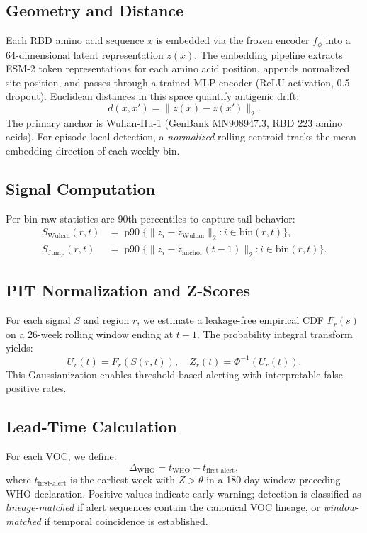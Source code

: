 \documentclass[11pt]{article}
\begin{document}
\subsection{Geometry and Distance}
Each RBD amino acid sequence $x$ is embedded via the frozen encoder $f_{\phi}$ into a 64-dimensional latent representation $z(x)$. The embedding pipeline extracts ESM-2 token representations for each amino acid position, appends normalized site position, and passes through a trained MLP encoder (ReLU activation, 0.5 dropout). Euclidean distances in this space quantify antigenic drift:
\[
d(x, x') = \|z(x) - z(x')\|_2.
\]
The primary anchor is Wuhan-Hu-1 (GenBank MN908947.3, RBD 223 amino acids). For episode-local detection, a \emph{normalized} rolling centroid tracks the mean embedding direction of each weekly bin.

\subsection{Signal Computation}
Per-bin raw statistics are 90th percentiles to capture tail behavior:
\begin{align}
S_{\text{Wuhan}}(r,t) &= \operatorname{p90}\{\|z_i - z_{\text{Wuhan}}\|_2 : i \in \text{bin}(r,t)\}, \\
S_{\text{Jump}}(r,t) &= \operatorname{p90}\{\|z_i - z_{\text{anchor}}(t-1)\|_2 : i \in \text{bin}(r,t)\}.
\end{align}

\subsection{PIT Normalization and Z-Scores}
For each signal $S$ and region $r$, we estimate a leakage-free empirical CDF $F_r(s)$ on a 26-week rolling window ending at $t-1$. The probability integral transform yields:
\[
U_r(t) = F_r(S(r,t)), \quad Z_r(t) = \Phi^{-1}(U_r(t)).
\]
This Gaussianization enables threshold-based alerting with interpretable false-positive rates.

\subsection{Lead-Time Calculation}
For each VOC, we define:
\[
\Delta_{\text{WHO}} = t_{\text{WHO}} - t_{\text{first-alert}},
\]
where $t_{\text{first-alert}}$ is the earliest week with $Z > \theta$ in a 180-day window preceding WHO declaration. Positive values indicate early warning; detection is classified as \emph{lineage-matched} if alert sequences contain the canonical VOC lineage, or \emph{window-matched} if temporal coincidence is established.
\end{document}
